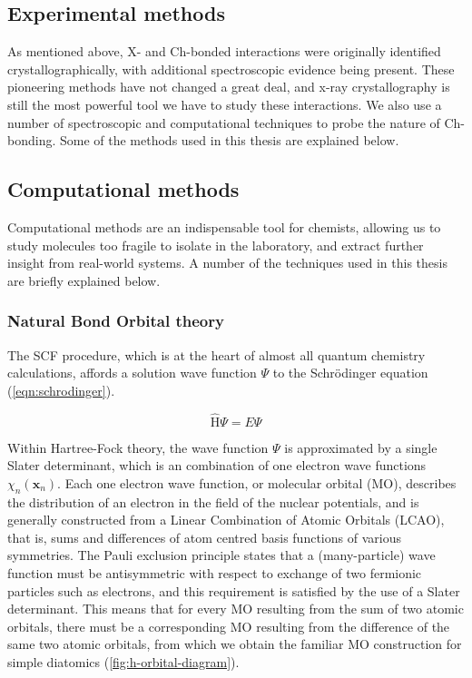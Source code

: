 \begin{refsection}

\chapter{Experimental methods}\label{ch:methods}
As mentioned above, X- and Ch-bonded interactions were originally identified crystallographically, with additional spectroscopic evidence being present.
These pioneering methods have not changed a great deal, and x-ray crystallography is still the most powerful tool we have to study these interactions.
We also use a number of spectroscopic and computational techniques to probe the nature of Ch-bonding.
Some of the methods used in this thesis are explained below.

\section{Computational methods}
Computational methods are an indispensable tool for chemists, allowing us to study molecules too fragile to isolate in the laboratory, and extract further insight from real-world systems.
A number of the techniques used in this thesis are briefly explained below.

\subsection{Natural Bond Orbital theory}
The SCF procedure, which is at the heart of almost all quantum chemistry calculations, affords a solution wave function $ \Psi $ to the Schr\"{o}dinger equation (\cref{eqn:schrodinger}).

\begin{equation}
    \hat{\mathrm{H}}\Psi = E\Psi
    \label{eqn:schrodinger}
\end{equation}

Within Hartree-Fock theory, the wave function $ \Psi $ is approximated by a single Slater determinant, which is an combination of one electron wave functions $\chi_{n}(\mathbf{x}_{n})$.
Each one electron wave function, or molecular orbital (MO), describes the distribution of an electron in the field of the nuclear potentials, and is generally constructed from a Linear Combination of Atomic Orbitals (LCAO), that is, sums and differences of atom centred basis functions of various symmetries.
The Pauli exclusion principle states that a (many-particle) wave function must be antisymmetric with respect to exchange of two fermionic particles such as electrons, and this requirement is satisfied by the use of a Slater determinant.
This means that for every MO resulting from the sum of two atomic orbitals, there must be a corresponding MO resulting from the difference of the same two atomic orbitals, from which we obtain the familiar MO construction for simple diatomics (\cref{fig:h-orbital-diagram}).


\end{refsection}
